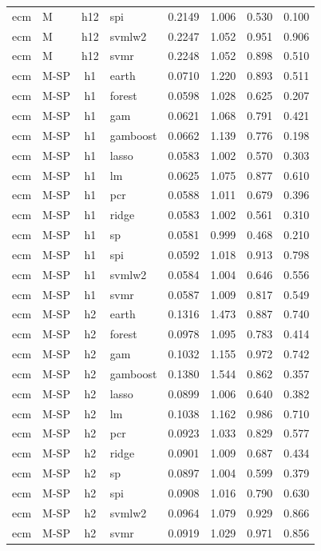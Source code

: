 \begin{ThreePartTable}
\begin{longtable}[t]{llclcccc}
ecm & M & h12 & spi & 0.2149 & 1.006 & 0.530 & 0.100\\
ecm & M & h12 & svmlw2 & 0.2247 & 1.052 & 0.951 & 0.906\\
ecm & M & h12 & svmr & 0.2248 & 1.052 & 0.898 & 0.510\\
\addlinespace
ecm & M-SP & h1 & earth & 0.0710 & 1.220 & 0.893 & 0.511\\
ecm & M-SP & h1 & forest & 0.0598 & 1.028 & 0.625 & 0.207\\
ecm & M-SP & h1 & gam & 0.0621 & 1.068 & 0.791 & 0.421\\
ecm & M-SP & h1 & gamboost & 0.0662 & 1.139 & 0.776 & 0.198\\
ecm & M-SP & h1 & lasso & 0.0583 & 1.002 & 0.570 & 0.303\\
ecm & M-SP & h1 & lm & 0.0625 & 1.075 & 0.877 & 0.610\\
ecm & M-SP & h1 & pcr & 0.0588 & 1.011 & 0.679 & 0.396\\
ecm & M-SP & h1 & ridge & 0.0583 & 1.002 & 0.561 & 0.310\\
ecm & M-SP & h1 & sp & 0.0581 & 0.999 & 0.468 & 0.210\\
ecm & M-SP & h1 & spi & 0.0592 & 1.018 & 0.913 & 0.798\\
ecm & M-SP & h1 & svmlw2 & 0.0584 & 1.004 & 0.646 & 0.556\\
ecm & M-SP & h1 & svmr & 0.0587 & 1.009 & 0.817 & 0.549\\
\addlinespace
ecm & M-SP & h2 & earth & 0.1316 & 1.473 & 0.887 & 0.740\\
ecm & M-SP & h2 & forest & 0.0978 & 1.095 & 0.783 & 0.414\\
ecm & M-SP & h2 & gam & 0.1032 & 1.155 & 0.972 & 0.742\\
ecm & M-SP & h2 & gamboost & 0.1380 & 1.544 & 0.862 & 0.357\\
ecm & M-SP & h2 & lasso & 0.0899 & 1.006 & 0.640 & 0.382\\
ecm & M-SP & h2 & lm & 0.1038 & 1.162 & 0.986 & 0.710\\
ecm & M-SP & h2 & pcr & 0.0923 & 1.033 & 0.829 & 0.577\\
ecm & M-SP & h2 & ridge & 0.0901 & 1.009 & 0.687 & 0.434\\
ecm & M-SP & h2 & sp & 0.0897 & 1.004 & 0.599 & 0.379\\
ecm & M-SP & h2 & spi & 0.0908 & 1.016 & 0.790 & 0.630\\
ecm & M-SP & h2 & svmlw2 & 0.0964 & 1.079 & 0.929 & 0.866\\
ecm & M-SP & h2 & svmr & 0.0919 & 1.029 & 0.971 & 0.856\\

\end{longtable}
\end{ThreePartTable}
